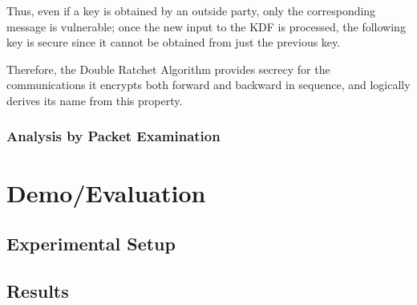 \documentclass[12pt]{article}
\begin{document}
\par Thus, even if a key is obtained by an outside party, only the corresponding message is vulnerable; once the new input to the KDF is processed, the following key is secure since it cannot be obtained from just the previous key.
\par Therefore, the Double Ratchet Algorithm provides secrecy for the communications it encrypts both forward and backward in sequence, and logically derives its name from this property. 


\subsubsection{Analysis by Packet Examination}

\newpage
\section{Demo/Evaluation}
\subsection{Experimental Setup}

\subsection{Results}
\end{document}
